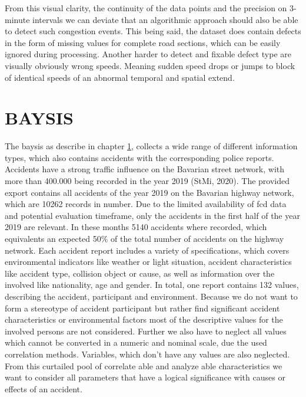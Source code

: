 \documentclass[a4paper,12pt]{report}
\begin{document}
From this visual clarity, the continuity of the data points and the precision on 3-minute intervals we can deviate that an algorithmic approach should also be able to detect such congestion events. This being said, the dataset does contain defects in the form of missing values for complete road sections, which can be easily ignored during processing. Another harder to detect and fixable defect type are visually obviously wrong speeds. Meaning sudden speed drops or jumps to block of identical speeds of an abnormal temporal and spatial extend. 


\section{BAYSIS}
\label{dataset_baysis}
\par The \acrfull{baysis} as describe in chapter \ref{dataset_baysis}, collects a wide range of different information types, which also contains accidents with the corresponding police reports. Accidents have a strong traffic influence on the Bavarian street network, with more than 400.000 being recorded in the year 2019 (StMi, 2020). The provided export contains all accidents of the year 2019 on the Bavarian highway network, which are 10262 records in number. Due to the limited availability of \acrshort{fcd} data and potential evaluation timeframe, only the accidents in the first half of the year 2019 are relevant. In these months 5140 accidents where recorded, which equivalents an expected 50\% of the total number of accidents on the highway network.
Each accident report includes a variety of specifications, which covers environmental indicators like weather or light situation, accident characteristics like accident type, collision object or cause, as well as information over the involved like nationality, age and gender. In total, one report contains 132 values, describing the accident, participant and environment. Because we do not want to form a stereotype of accident participant but rather find significant accident characteristics or environmental factors most of the descriptive values for the involved persons are not considered. Further we also have to neglect all values which cannot be converted in a numeric and nominal scale, due the used correlation methods. Variables, which don’t have any values are also neglected. From this curtailed pool of correlate able and analyze able characteristics we want to consider all parameters that have a logical significance with causes or effects of an accident.
\end{document}
